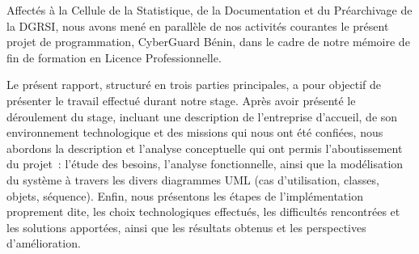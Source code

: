 Affect\'es \`a la Cellule de la Statistique, de la Documentation et du
Pr\'earchivage de la DGRSI, nous avons men\'e en parall\`ele de nos activit\'es
courantes le pr\'esent projet de programmation, CyberGuard B\'enin, dans le cadre
de notre m\'emoire de fin de formation en Licence Professionnelle.

Le pr\'esent rapport, structur\'e en trois parties principales, a pour objectif de
pr\'esenter le travail effectu\'e durant notre stage. Apr\`es avoir pr\'esent\'e le
d\'eroulement du stage, incluant une description de l'entreprise d'accueil, de son
environnement technologique et des missions qui nous ont \'et\'e confi\'ees, nous
abordons la description et l'analyse conceptuelle qui ont permis l'aboutissement
du projet~: l'\'etude des besoins, l'analyse fonctionnelle, ainsi que la
mod\'elisation du syst\`eme \`a travers les divers diagrammes UML (cas d'utilisation,
classes, objets, s\'equence). Enfin, nous pr\'esentons les \'etapes de
l'impl\'ementation proprement dite, les choix technologiques effectu\'es, les
difficult\'es rencontr\'ees et les solutions apport\'ees, ainsi que les r\'esultats
obtenus et les perspectives d'am\'elioration.
